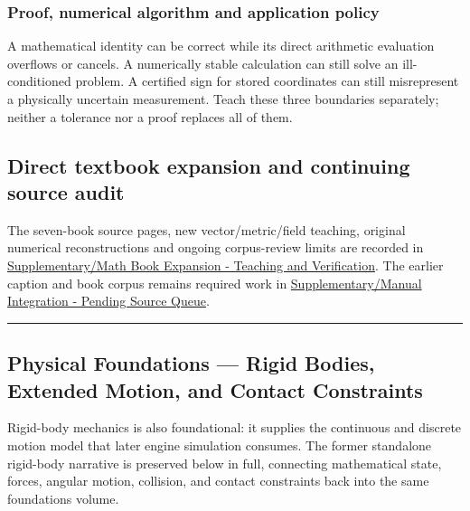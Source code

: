 \subsubsection{Proof, numerical algorithm and application policy}\label{02-foundations-ii-ch039-proof-numerical-algorithm-and-application-policy}

\hypertarget{02-foundations-ii-ch039-proof-numerical-algorithm-and-application-policy}{}

A mathematical identity can be correct while its direct arithmetic evaluation overflows or cancels. A numerically stable calculation can still solve an ill-conditioned problem. A certified sign for stored coordinates can still misrepresent a physically uncertain measurement. Teach these three boundaries separately; neither a tolerance nor a proof replaces all of them.

\subsection{Direct textbook expansion and continuing source audit}\label{02-foundations-ii-ch039-direct-textbook-expansion-and-continuing-source-audit}

\hypertarget{02-foundations-ii-ch039-direct-textbook-expansion-and-continuing-source-audit}{}

The seven-book source pages, new vector/metric/field teaching, original numerical reconstructions and ongoing corpus-review limits are recorded in \hyperref[appendix-5056f3debc1f]{Supplementary/Math Book Expansion - Teaching and Verification}. The earlier caption and book corpus remains required work in \hyperref[appendix-ac1f51db5e9a]{Supplementary/Manual Integration - Pending Source Queue}.

\begin{center}\rule{0.5\linewidth}{0.5pt}\end{center}

\subsection{Physical Foundations --- Rigid Bodies, Extended Motion, and Contact Constraints}\label{02-foundations-ii-ch039-physical-foundations-rigid-bodies-extended-motion-and-contact-constraints}

\hypertarget{02-foundations-ii-ch039-physical-foundations-rigid-bodies-extended-motion-and-contact-constraints}{}

Rigid-body mechanics is also foundational: it supplies the continuous and discrete motion model that later engine simulation consumes. The former standalone rigid-body narrative is preserved below in full, connecting mathematical state, forces, angular motion, collision, and contact constraints back into the same foundations volume.

